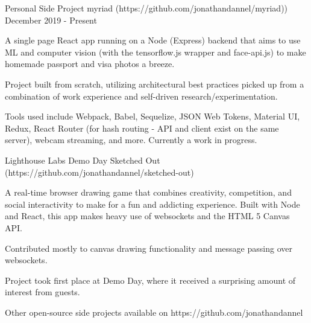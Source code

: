

\begin{cventries}

  \cventry
    {Personal Side Project} %
    {myriad ({\tiny https://github.com/jonathandannel/myriad)})} %
    {} %
    {December 2019 - Present} %
    {
      \begin{cvitems} %
        \item {A single page React app running on a Node (Express) backend that aims to use ML and computer vision (with the tensorflow.js wrapper and face-api.js) to make homemade passport and visa photos a breeze.}
        \item{Project built from scratch, utilizing architectural best practices picked up from a combination of work experience and self-driven research/experimentation.}
        \item{Tools used include Webpack, Babel, Sequelize, JSON Web Tokens, Material UI, Redux, React Router (for hash routing - API and client exist on the same server), webcam streaming, and more. Currently a work in progress.}
      \end{cvitems}
    }

\cventry
    {Lighthouse Labs Demo Day}
    {Sketched Out ({\tiny https://github.com/jonathandannel/sketched-out})}
    {}
    {}
    {
     \begin{cvitems} %
        \item {A real-time browser drawing game that combines creativity, competition, and social interactivity to make for a fun and addicting experience. Built with Node and React, this app makes heavy use of websockets and the HTML 5 Canvas API.}
        \item {Contributed mostly to canvas drawing functionality and message passing over websockets.}
        \item{Project took first place at Demo Day, where it received a surprising amount of interest from guests. }
        \item{Other open-source side projects available on https://github.com/jonathandannel}
      \end{cvitems}
    }
    
\end{cventries}



